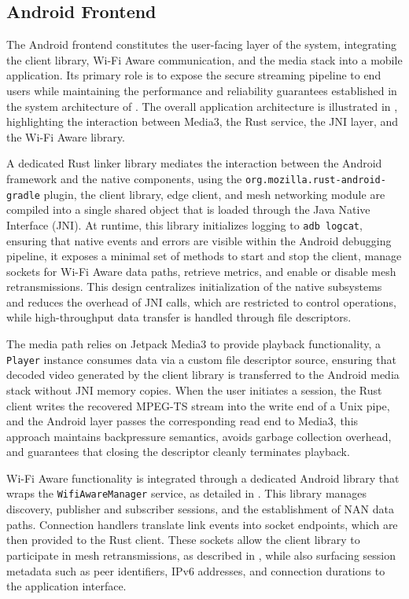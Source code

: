 \subsection{Android Frontend}
\label{sec:android frontend}

\quad The Android frontend constitutes the user-facing layer of the system, integrating the client library, Wi-Fi Aware communication, and the media stack into a mobile application. Its primary role is to expose the secure streaming pipeline to end users while maintaining the performance and reliability guarantees established in the system architecture of \textbf{}. The overall application architecture is illustrated in \textbf{}, highlighting the interaction between Media3, the Rust service, the JNI layer, and the Wi-Fi Aware library.

\quad A dedicated Rust linker library mediates the interaction between the Android framework and the native components, using the \texttt{org.mozilla.rust-android-gradle} plugin, the client library, edge client, and mesh networking module are compiled into a single shared object that is loaded through the Java Native Interface (JNI). At runtime, this library initializes logging to \texttt{adb logcat}, ensuring that native events and errors are visible within the Android debugging pipeline, it exposes a minimal set of methods to start and stop the client, manage sockets for Wi-Fi Aware data paths, retrieve metrics, and enable or disable mesh retransmissions. This design centralizes initialization of the native subsystems and reduces the overhead of JNI calls, which are restricted to control operations, while high-throughput data transfer is handled through file descriptors.

\quad The media path relies on Jetpack Media3 to provide playback functionality, a \texttt{Player} instance consumes data via a custom file descriptor source, ensuring that decoded video generated by the client library is transferred to the Android media stack without JNI memory copies. When the user initiates a session, the Rust client writes the recovered MPEG-TS stream into the write end of a Unix pipe, and the Android layer passes the corresponding read end to Media3, this approach maintains backpressure semantics, avoids garbage collection overhead, and guarantees that closing the descriptor cleanly terminates playback.

\quad Wi-Fi Aware functionality is integrated through a dedicated Android library that wraps the \texttt{WifiAwareManager} service, as detailed in \textbf{}. This library manages discovery, publisher and subscriber sessions, and the establishment of NAN data paths. Connection handlers translate link events into socket endpoints, which are then provided to the Rust client. These sockets allow the client library to participate in mesh retransmissions, as described in \textbf{}, while also surfacing session metadata such as peer identifiers, IPv6 addresses, and connection durations to the application interface.

